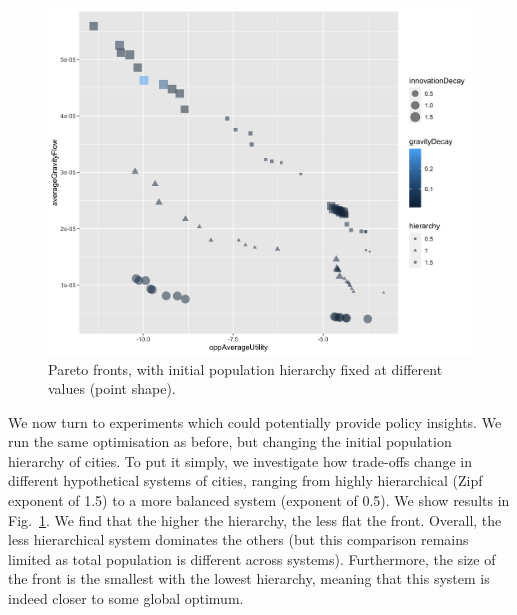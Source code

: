 \documentclass{article}
\begin{document}



\begin{figure}
	\centering
	\includegraphics[width=\linewidth]{pareto-oppAverageUtility-averageGravityFlow_VARYINGHIERARCHY_color-gravityDecay_size-innovationDecay.png}
	\caption{Pareto fronts, with initial population hierarchy fixed at different values (point shape).\label{fig:fig2}}
\end{figure}


We now turn to experiments which could potentially provide policy insights. We run the same optimisation as before, but changing the initial population hierarchy of cities. To put it simply, we investigate how trade-offs change in different hypothetical systems of cities, ranging from highly hierarchical (Zipf exponent of 1.5) to a more balanced system (exponent of 0.5). We show results in Fig.~\ref{fig:fig2}. We find that the higher the hierarchy, the less flat the front. Overall, the less hierarchical system dominates the others (but this comparison remains limited as total population is different across systems). Furthermore, the size of the front is the smallest with the lowest hierarchy, meaning that this system is indeed closer to some global optimum.
\end{document}
